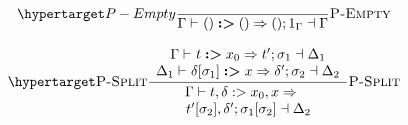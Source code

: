 \begin{figure*}
\begin{raggedright}
{\begin{minipage}[t]{1\textwidth - 2\fboxsep - 2\fboxrule}
\begin{minipage}[c]{0.49\textwidth}%
\begin{flushleft}
\par\end{flushleft}%
\end{minipage}%
\begin{minipage}[c]{0.5\columnwidth}%
\begin{flushleft}
\[
\labellabelrule{\dfrac{}{\pruningemptyconcl}}{P-Empty}
\]
\par\end{flushleft}
\begin{flushleft}
\[
\labellabelrule{\dfrac{\begin{array}{c}
\Gamma\prune t{x_{0}}{\sigma_{1}}{t'}\dashv\Delta_{1}\\
\Delta_{1}\prune{\delta[\sigma_{1}]}x{\sigma_{2}\dashv\Delta_{2}}{\delta'}
\end{array}}{\begin{array}{r}
\Gamma\vdash t,\delta:>x_{0},x\Rightarrow\quad\\
t'[\sigma_{2}],\delta';\sigma_{1}[\sigma_{2}]\dashv\Delta_{2}
\end{array}}}{\textsc{P-Split}}
\]
\par\end{flushleft}
%
\end{minipage}%
\end{minipage}}
\par\end{raggedright}
\begin{raggedright}
\noindent{}
\end{raggedright}
\end{figure*}

